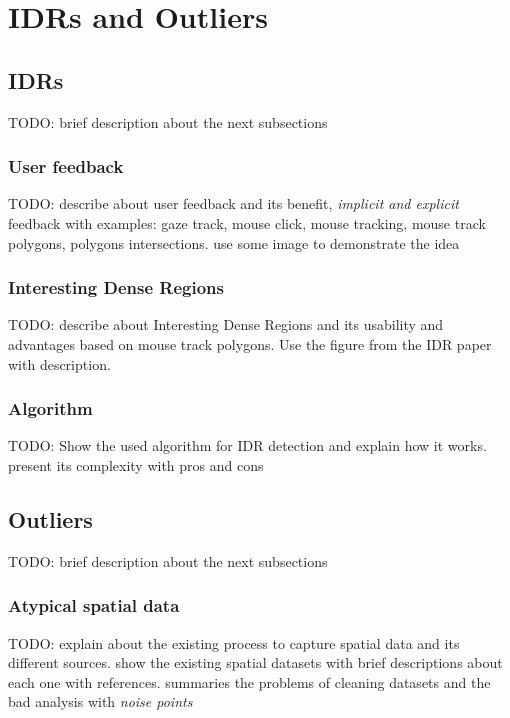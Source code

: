 \chapter{IDRs and Outliers}

\section{IDRs}

TODO: brief description about the next subsections

\subsection{User feedback}

TODO: describe about user feedback and its benefit, \textit{implicit and explicit} feedback with examples: gaze track, mouse click, mouse tracking, mouse track polygons, polygons intersections. use some image to demonstrate the idea

\subsection{Interesting Dense Regions}

TODO: describe about Interesting Dense Regions and its usability and advantages based on mouse track polygons. Use the figure from the IDR paper with description.

\subsection{Algorithm}

TODO: Show the used algorithm for IDR detection and explain how it works. present its complexity with pros and cons

\section{Outliers}

TODO: brief description about the next subsections

\subsection{Atypical spatial data}

TODO: explain about the existing process to capture spatial data and its different sources. show the existing spatial datasets with brief descriptions about each one with references. summaries the problems of cleaning datasets and the bad analysis with \textit{noise points}

